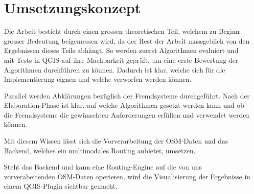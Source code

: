 \section{Umsetzungskonzept}
\label{sec:Umsetzungskonzept}

Die Arbeit besticht durch einen grossen theoretischen Teil, welchem zu Beginn grosser Bedeutung beigemessen wird, da der Rest der Arbeit massgeblich von den Ergebnissen dieses Teils abhängt. So werden zuerst Algorithmen evaluiert und mit Tests in QGIS auf ihre Machbarkeit geprüft, um eine erste Bewertung der Algorithmen durchführen zu können. Dadurch ist klar, welche sich für die Implementierung eignen und welche verworfen werden können.

Parallel werden Abklärungen bezüglich der Fremdsysteme durchgeführt. Nach der Elaboration-Phase ist klar, auf welche Algorithmen gesetzt werden kann und ob die Fremdsysteme die gewünschten Anforderungen erfüllen und verwendet werden können.

Mit diesem Wissen lässt sich die Vorverarbeitung der \ac{OSM}-Daten und das Backend, welches ein multimodales Routing anbietet, umsetzen.

Steht das Backend und kann eine Routing-Engine auf die von uns vorverabeitenden \ac{OSM}-Daten operieren, wird die Visualisierung der Ergebnisse in einem QGIS-Plugin sichtbar gemacht.
